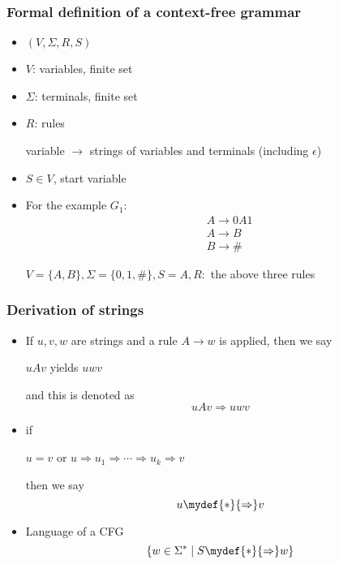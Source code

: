 \begin{frame}[allowframebreaks]
  \frametitle{Formal definition of a context-free
    grammar}
    \begin{itemize}
\item $(V,\Sigma, R, S)$

\item [] $V$: variables, finite set

\item [] $\Sigma$: terminals, finite set

\item [] $R$: rules
\begin{center}
  variable
$\rightarrow$ strings of variables and
terminals (including $\epsilon$)
\end{center}

\item $S\in V$, start variable

\item For the example $G_1$:
\begin{eqnarray*}
  && A \rightarrow 0A1\\
&& A \rightarrow B\\
&& B \rightarrow \#
\end{eqnarray*}

$V=\{A,B\}, \Sigma=\{0,1,\#\}, S = A, R:$
the above three rules
\end{itemize}
\end{frame}

\begin{frame}[allowframebreaks]
  \frametitle{Derivation of strings}
    \begin{itemize}
\item If $u,v,w$ are strings and a rule  $A \rightarrow
w$ is applied, then we say
\begin{center}
$uAv$ yields $uwv$
\end{center}
and this is denoted as
\begin{equation*}
uAv \Rightarrow uwv
\end{equation*}
\item if 
  \begin{center}
$u=v$ or 
$u \Rightarrow u_1 \Rightarrow \cdots \Rightarrow
u_k \Rightarrow v$
\end{center}
then we say
\begin{equation*}
u \mydef{*}{\Rightarrow} v 
\end{equation*}
\item Language of a CFG
  \begin{equation*}
\{ w \in \Sigma^*\mid 
S \mydef{*}{\Rightarrow} w\}
\end{equation*}
\end{itemize}\end{frame} 

